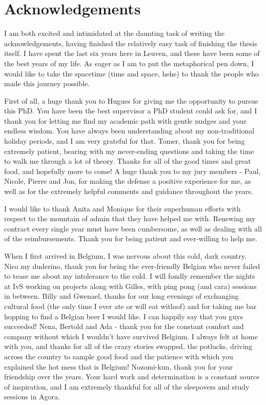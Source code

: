 \chapter{Acknowledgements}\label{ch:Acknowledgements}

I am both excited and intimidated at the daunting task of writing the acknowledgements, having finished the relatively easy task of finishing the thesis itself. I have spent the last six years here in Leuven, and these have been some of the best years of my life. As eager as I am to put the metaphorical pen down, I would like to take the spacetime (time and space, hehe) to thank the people who made this journey possible.

First of all, a huge thank you to Hugues for giving me the opportunity to pursue this PhD. You have been the best supervisor a PhD student could ask for, and I thank you for letting me find my academic path with gentle nudges and your endless wisdom. You have always been understanding about my non-traditional holiday periods, and I am very grateful for that. Tomer, thank you for being extremely patient, bearing with my never-ending questions and taking the time to walk me through a lot of theory. Thanks for all of the good times and great food, and hopefully more to come! A huge thank you to my jury members - Paul, Nicole, Pierre and Jon, for making the defense a positive experience for me, as well as for the extremely helpful comments and guidance throughout the years.

I would like to thank Anita and Monique for their superhuman efforts with respect to the mountain of admin that they have helped me with. Renewing my contract every single year must have been cumbersome, as well as dealing with all of the reimbursements. Thank you for being patient and ever-willing to help me.

When I first arrived in Belgium, I was nervous about this cold, dark country. Nico my duderino, thank you for being the ever-friendly Belgian who never failed to tease me about my intolerance to the cold. I will fondly remember the nights at IvS working on projects along with Gilles, with ping pong (and cara) sessions in between. Billy and Gwenael, thanks for our long evenings of exchanging cultural food (the only time I ever ate or will eat witloof) and for taking me bar hopping to find a Belgian beer I would like. I can happily say that you guys succeeded! Nena, Bertold and Ada - thank you for the constant comfort and company without which I wouldn't have survived Belgium. I always felt at home with you, and thanks for all of the crazy stories swapped, the potlucks, driving across the country to sample good food and the patience with which you explained the hot mess that is Belgium! Nozomi-kun, thank you for your friendship over the years. Your hard work and determination is a constant source of inspiration, and I am extremely thankful for all of the sleepovers and study sessions in Agora.

